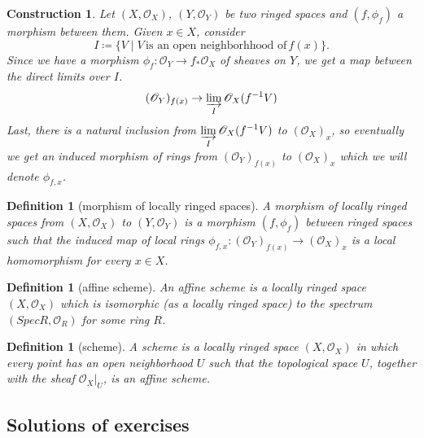 \documentclass[12pt]{article}
\newtheorem{definition}[proposition]{Definition}
\newtheorem{cons}[proposition]{Construction}
\begin{document}
\begin{cons}
	Let $(X, \mathscr{O}_X)$, $(Y, \mathscr{O}_Y)$ be two ringed spaces and $(f, \phi_f)$ a morphism between them. Given $x \in X$, consider 
	\[
	I \coloneqq \lbrace V \mid V \, \text{is an open neighborhhood of}\, f(x) \rbrace .
	\]
	Since we have a morphism $\phi_f: \mathscr{O}_Y \rightarrow f_* \mathscr{O}_X $ of sheaves on $Y$, we get a map between the direct limits over $I$. 
	\[
	(\mathscr{O}_Y)_{f(x)} \rightarrow \displaystyle \varinjlim_I \mathscr{O}_X (f^{-1} V)
	\]
	Last, there is a natural inclusion from $\displaystyle \varinjlim_I \mathscr{O}_X (f^{-1} V)$ to $(\mathscr{O}_X)_x$, so eventually we get an induced morphism of rings from $(\mathscr{O}_Y)_{f(x)}$ to $(\mathscr{O}_X)_x$ which we will denote $\phi_{f, x}$. 
\end{cons}	
				
\begin{definition}[morphism of locally ringed spaces]
	A morphism of locally ringed spaces from $(X, \mathscr{O}_X)$ to $(Y, \mathscr{O}_Y)$ is a morphism $(f, \phi_f)$ between ringed spaces such that the induced map of local rings $\phi_{f, x}: (\mathscr{O}_Y)_{f(x)} \rightarrow (\mathscr{O}_X)_x$ is a local homomorphism for every $x \in X$.  
\end{definition}	

\begin{definition}[affine scheme]
	An affine scheme is a locally ringed space $(X, \mathscr{O}_X)$ which is isomorphic (as a locally ringed space) to the spectrum $(Spec R, \mathscr{O}_R)$ for some ring $R$. 
\end{definition}

\begin{definition}[scheme]
	A scheme is a locally ringed space $(X, \mathscr{O}_X)$ in which every point has an open neighborhood $U$ such that the topological space $U$, together with the sheaf $\mathscr{O}_X | _U$, is an affine scheme.
\end{definition}	
																	

\begin{appendices}
	\addappheadtotoc

\section{Solutions of exercises}

	

	
\end{appendices}						

		
\end{document}
